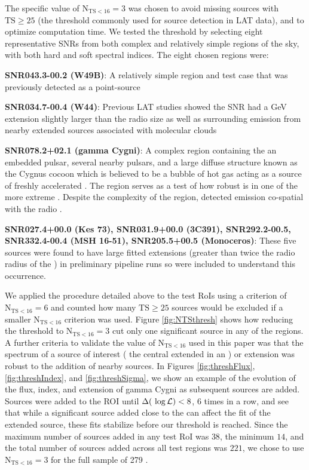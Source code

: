 {The specific value of $\mathrm{N_{TS < 16} = 3}$ was chosen to avoid missing sources with $\mathrm{TS \geq 25}$ (the threshold commonly used for source detection in LAT data), and to optimize computation time. We tested the threshold by selecting eight representative SNRs from both complex and relatively simple regions of the sky, with both hard and soft spectral indices. The eight chosen regions were:

{\bfseries SNR043.3-00.2 (W49B)}: A relatively simple region and test case that was previously detected as a point-source  \snr{} \citep{Abdo10-W49B}

{\bfseries SNR034.7-00.4 (W44)}: Previous LAT studies showed the SNR had a GeV extension slightly larger than the radio size as well as surrounding\gev{} emission from nearby extended sources associated with molecular clouds \citep{Abdo10-W44,Uchiyama12-W44Vicin}

{\bfseries SNR078.2+02.1 (gamma Cygni)}: A complex region containing the \snr{} an embedded pulsar, several nearby pulsars, and a large diffuse structure known as the Cygnus cocoon which is believed to be a bubble of hot gas acting as a source of freshly accelerated \crs{} \citep{Ackermann12-CygnusCR,Ackermann11-CygnusCocoon}. The region serves as a test of how robust \srcs{} is in one of the more extreme \rois{}. Despite the complexity of the region, \cite{Lande12} detected \gev{} emission co-spatial with the radio \snr{}.

{\bfseries SNR027.4+00.0 (Kes 73), SNR031.9+00.0 (3C391), SNR292.2-00.5, SNR332.4-00.4 (MSH 16-51), SNR205.5+00.5 (Monoceros)}: These five  sources were found to have large fitted extensions (greater than twice the radio radius of the \snr{}) in preliminary \snrcat{} pipeline runs so were included to understand this occurrence.

We applied the procedure detailed above to the test RoIs using a criterion of $\mathrm{N_{TS < 16} = 6}$ and counted how many $\mathrm{TS \geq 25}$ sources would be excluded if a smaller $\mathrm{N_{TS < 16}}$ criterion was used. Figure \ref{fig:NTSthresh} shows how reducing the threshold to $\mathrm{N_{TS < 16} = 3}$ cut only one significant source in any of the regions. A further criteria to validate the value of $\mathrm{N_{TS < 16}}$ used in this paper was that the spectrum of a source of interest (\ie{} the central extended \snr{} in an \roi{}) or extension was robust to the addition of nearby sources. In Figures \ref{fig:threshFlux}, \ref{fig:threshIndex}, and  \ref{fig:threshSigma}, we show an example of the evolution of the flux, index, and extension of \snr{} gamma Cygni  as subsequent sources are added.  Sources were added to the ROI until $\Delta(~\mathrm{\log\mathcal{L}}{}) < 8$, 6 times in a row, and see that while a significant source added close to the \snr{} can affect the fit of the extended source, these fits stabilize before our threshold is reached. Since the maximum number of sources added in any test RoI was $38$, the minimum $14$, and the total number of sources added across all test regions was $221$, we chose to use $\mathrm{N_{TS < 16} = 3}$ for the full sample of 279 \rois{}. 

}
